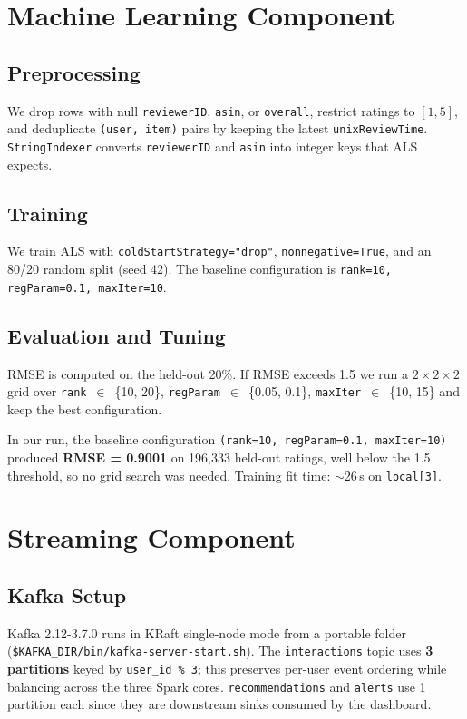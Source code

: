 \documentclass[11pt,a4paper]{article}
\begin{document}
\section{Machine Learning Component}
\subsection{Preprocessing}
We drop rows with null \texttt{reviewerID}, \texttt{asin}, or \texttt{overall},
restrict ratings to $[1,5]$, and deduplicate \texttt{(user, item)} pairs by
keeping the latest \texttt{unixReviewTime}. \texttt{StringIndexer} converts
\texttt{reviewerID} and \texttt{asin} into integer keys that ALS expects.

\subsection{Training}
We train ALS with \texttt{coldStartStrategy="drop"}, \texttt{nonnegative=True},
and an 80/20 random split (seed 42). The baseline configuration is
\texttt{rank=10, regParam=0.1, maxIter=10}.

\subsection{Evaluation and Tuning}
RMSE is computed on the held-out 20\%. If RMSE exceeds 1.5 we run a
$2{\times}2{\times}2$ grid over \texttt{rank}~$\in$~\{10, 20\},
\texttt{regParam}~$\in$~\{0.05, 0.1\}, \texttt{maxIter}~$\in$~\{10, 15\} and
keep the best configuration.

In our run, the baseline configuration \texttt{(rank=10, regParam=0.1,
maxIter=10)} produced \textbf{RMSE = 0.9001} on 196{,}333 held-out ratings,
well below the 1.5 threshold, so no grid search was needed.
Training fit time: $\sim$26\,s on \texttt{local[3]}.

\section{Streaming Component}
\subsection{Kafka Setup}
Kafka 2.12-3.7.0 runs in KRaft single-node mode from a portable folder
(\texttt{\$KAFKA\_DIR/bin/}\allowbreak\texttt{kafka-server-start.sh}). The
\texttt{interactions} topic uses \textbf{3 partitions} keyed by
\texttt{user\_id\,\%\,3}; this preserves per-user event ordering while balancing
across the three Spark cores. \texttt{recommendations} and \texttt{alerts} use
1 partition each since they are downstream sinks consumed by the dashboard.
\end{document}
